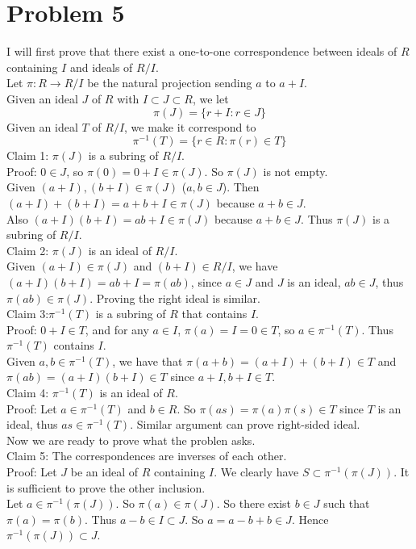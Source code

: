 \documentclass[12pt]{article}
\begin{document}
\section*{Problem 5}
I will first prove that there exist a one-to-one correspondence between ideals of $R$ containing $I$ and ideals of $R/I$. \\
Let $\pi : R \rightarrow R/I$ be the natural projection sending $a$ to $a+I$. \\
Given an ideal $J$ of $R$ with $I \subset J \subset R$, we let
$$\pi (J)=\{r+I : r \in J\}$$
Given an ideal $T$ of $R/I$, we make it correspond to
$$\pi^{-1} (T)=\{r \in R: \pi (r) \in T\}$$
Claim 1: $\pi(J)$ is a subring of $R/I$. \\
Proof: 
$0 \in J$, so $\pi(0)=0+I \in \pi(J)$. So $\pi(J)$ is not empty. \\
Given $(a+I),(b+I) \in \pi(J)$ ($a,b \in J$). Then 
$(a+I)+(b+I)=a+b+I \in \pi(J)$ because $a+b \in J$. \\
Also $(a+I)(b+I)=ab+I \in \pi(J)$ because $a+b \in J$.
Thus $\pi(J)$ is a subring of $R/I$.\\
Claim 2: $\pi(J)$ is an ideal of $R/I$. \\
Given $(a+I) \in \pi(J)$ and $(b+I) \in R/I$, we have
$(a+I)(b+I)=ab+I =\pi(ab)$, since $a \in J$ and $J$ is an ideal, $ab \in J$, thus $\pi (ab) \in \pi(J)$. Proving the right ideal is similar. \\
Claim 3:$\pi^{-1} (T)$ is a subring of $R$ that contains $I$. \\
Proof: $0+I \in T$, and for any $a \in I$, $\pi(a)=I=0 \in T$, so $a \in \pi^{-1}(T)$. Thus $\pi^{-1} (T)$ contains $I$. \\
Given $a,b \in \pi^{-1} (T)$, we have that $\pi(a+b)=(a+I)+(b+I) \in T$ and $\pi(ab)=(a+I)(b+I) \in T$ since 
$a+I,b+I \in T$.  \\
Claim 4: $\pi^{-1} (T)$ is an ideal of $R$. \\
Proof: 
Let $a \in \pi^{-1} (T)$ and $b \in R$. So 
$\pi(as)=\pi(a) \pi(s) \in T$ since $T$ is an ideal, thus $as \in \pi^{-1} (T)$. Similar argument can prove right-sided ideal.\\
Now we are ready to prove what the problen asks. \\
Claim 5: The correspondences are inverses of each other.
\\
Proof:
Let $J$ be an ideal of $R$ containing $I$. We clearly have $S \subset \pi^{-1} (\pi (J))$. It is sufficient to prove the other inclusion. \\
Let $a \in \pi^{-1} (\pi (J))$. So $\pi(a) \in \pi(J)$. So there exist $b \in J$ such that $\pi(a)=\pi(b)$. Thus $a-b \in I \subset J$. So $a=a-b+b \in J$. Hence $\pi^{-1} (\pi(J)) \subset J$. \\
\end{document}
